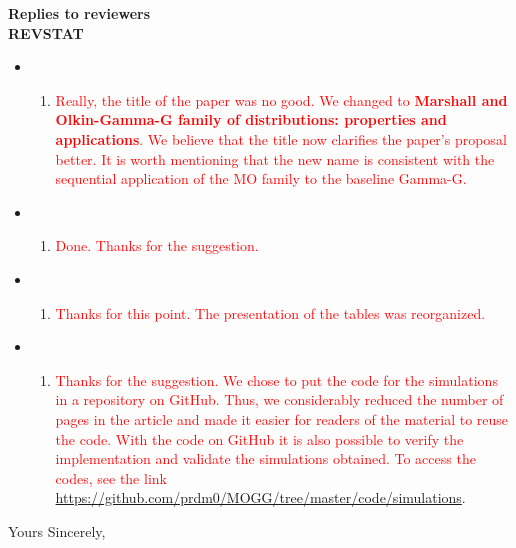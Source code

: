 \documentclass[version=last,12pt,{"maintainersDelight"}]{scrlttr2}
\providecommand{\tightlist}{%
  \setlength{\itemsep}{0pt}\setlength{\parskip}{0pt}}
\begin{document}
\begin{letter}{\textbf{Replies to reviewers}\\\textbf{REVSTAT}\\}
\begin{itemize}
\item
  \begin{enumerate}
  \def\labelenumi{(\roman{enumi})}
  \tightlist
  \item
    \textcolor{red}{ Really, the title of the paper was no good. We changed to \textbf{Marshall and Olkin-Gamma-G family of distributions: properties and applications}. We believe that the title now clarifies the paper's proposal better. It is worth mentioning that the new name is consistent with the sequential application of the MO family to the baseline Gamma-G.}
  \end{enumerate}
\item
  \begin{enumerate}
  \def\labelenumi{(\roman{enumi})}
  \setcounter{enumi}{1}
  \tightlist
  \item
    \textcolor{red}{Done. Thanks for the suggestion.}
  \end{enumerate}
\item
  \begin{enumerate}
  \def\labelenumi{(\roman{enumi})}
  \setcounter{enumi}{2}
  \tightlist
  \item
    \textcolor{red}{Thanks for this point. The presentation of the tables was reorganized.}
  \end{enumerate}
\item
  \begin{enumerate}
  \def\labelenumi{(\roman{enumi})}
  \setcounter{enumi}{3}
  \tightlist
  \item
    \textcolor{red}{Thanks for the suggestion. We chose to put the code for the simulations in a repository on GitHub. Thus, we considerably reduced the number of pages in the article and made it easier for readers of the material to reuse the code. With the code on GitHub it is also possible to verify the implementation and validate the simulations obtained. To access the codes, see the link 
    \url{https://github.com/prdm0/MOGG/tree/master/code/simulations}}.
  \end{enumerate}
\end{itemize}

\closing{Yours Sincerely,}




 \end{letter}
\end{document}
